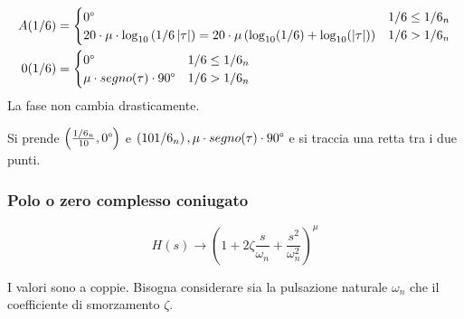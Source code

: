 \documentclass[a4paper]{article}
\begin{document}
\begin{definition}
  \[
    \begin{aligned}
      A(1/6) &= \begin{cases}
        0\degree & 1/6 \le 1/6_n\\
        20 \cdot \mu \cdot \log_{10} \left( 1/6 \left| \tau \right|  \right) =
        20 \cdot \mu \left( \log_{10}(1/6) + \log_{10}(|\tau|) \right)  & 1/6 > 1/6_n
      \end{cases}\\
        0(1/6) &= \begin{cases}
          0\degree & 1/6 \le 1/6_n\\
          \mu \cdot segno(\tau) \cdot 90\degree & 1/6 > 1/6_n
        \end{cases}
        \end{aligned}
      \] 
      La fase non cambia drasticamente.

      Si prende \( \left( \frac{1/6_n}{10}, 0\degree \right)  \) e \( \left( 10 1/6_n \right), 
      \mu \cdot segno(\tau) \cdot 90\degree\) e si traccia una retta tra i due punti.
\end{definition}

\subsubsection{Polo o zero complesso coniugato}
\[
  H(s) \to \left( 1 + 2 \zeta \frac{s}{\omega_n} + \frac{s^2}{\omega_n^2} \right)^{\mu}
\]
\begin{figure}[H]
  \centering
\end{figure}
\noindent
I valori sono a coppie. Bisogna considerare sia la pulsazione naturale \( \omega_n \)
che il coefficiente di smorzamento \( \zeta \).
\end{document}
